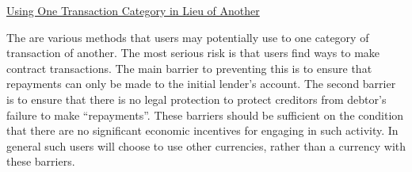 \underline{Using One Transaction Category in Lieu of Another}

The are various methods that users may potentially use to one category of transaction of another.
The most serious risk is that users find ways to make contract transactions. The main barrier to
preventing this is to ensure that repayments can only be made to the initial lender's account. The
second barrier is to ensure that there is no legal protection to protect creditors from debtor's
failure to make ``repayments''. These barriers should be sufficient on the condition that there are
no significant economic incentives for engaging in such activity. In general such users will choose to
use other currencies, rather than a currency with these barriers.

